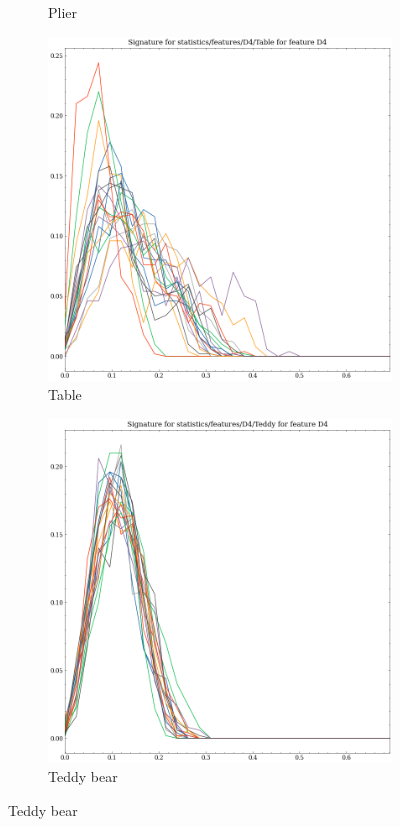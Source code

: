 \begin{figure}
\begin{subfigure}[b]{0.23\textwidth}
        \caption{Plier}
    \end{subfigure}
    \hfill
    \begin{subfigure}[b]{0.23\textwidth}
        \includegraphics[width=\textwidth]{assets/feature_extraction/D4/Table.png}
        \caption{Table}
    \end{subfigure}
    \hfill
    \begin{subfigure}[b]{0.23\textwidth}
        \includegraphics[width=\textwidth]{assets/feature_extraction/D4/Teddy.png}
        \caption{Teddy bear}
    \end{subfigure}
    \hfill


\end{figure}

